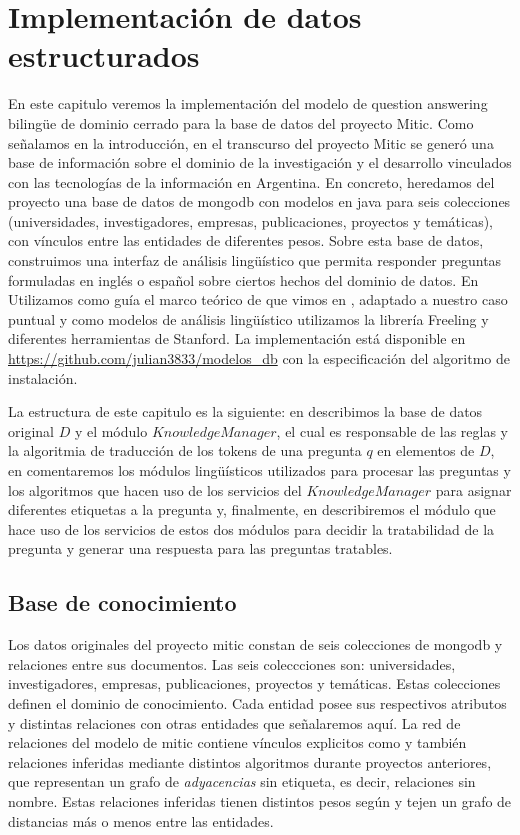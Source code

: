 \chapter{Implementación de datos estructurados}
\label{chap:4}
\horrible
En este capitulo veremos la implementación del modelo de question answering bilingüe de dominio cerrado para la base de datos del proyecto Mitic. Como señalamos en la introducción, en el transcurso del proyecto Mitic se generó una base de información sobre el dominio de la investigación y el desarrollo vinculados con las tecnologías de la información en Argentina. En concreto, heredamos del proyecto una base de datos de mongodb con modelos en java para seis colecciones (universidades, investigadores, empresas, publicaciones, proyectos y temáticas), con vínculos entre las entidades de diferentes pesos. Sobre esta base de datos, construimos una interfaz de análisis lingüístico que permita responder preguntas formuladas en inglés o español sobre ciertos hechos del dominio de datos. En Utilizamos como guía el marco teórico de \cite{QADB1} que vimos en , adaptado a nuestro caso puntual y como modelos de análisis lingüístico utilizamos la librería Freeling y diferentes herramientas de Stanford. La implementación está disponible en \url{https://github.com/julian3833/modelos_db} con la especificación del algoritmo de instalación. 

La estructura de este capitulo es la siguiente: en  describimos la base de datos original $D$ y el módulo $KnowledgeManager$, el cual es responsable de las reglas y la algoritmia de traducción de los tokens de una pregunta $q$ en elementos de $D$, en  comentaremos los módulos lingüísticos utilizados para procesar las preguntas y los algoritmos que hacen uso de los servicios del $KnowledgeManager$ para asignar diferentes etiquetas a la pregunta y, finalmente, en  describiremos el módulo que hace uso de los servicios de estos dos módulos para decidir la tratabilidad de la pregunta y generar una respuesta para las preguntas tratables.

\section{Base de conocimiento}
\label{sec:grafo-mitic}

Los datos originales del proyecto mitic constan de seis colecciones de mongodb y relaciones entre sus documentos. Las seis coleccciones son: universidades, investigadores, empresas, publicaciones, proyectos y temáticas. Estas colecciones definen el dominio de conocimiento. Cada entidad posee sus respectivos atributos y distintas relaciones con otras entidades que señalaremos aquí. La red de relaciones del modelo de mitic contiene vínculos explicitos como  y también relaciones inferidas mediante distintos algoritmos durante proyectos anteriores, que representan un grafo de \textit{adyacencias} sin etiqueta, es decir, relaciones sin nombre. Estas relaciones inferidas tienen distintos pesos según y tejen un grafo de distancias más o menos  entre las entidades. 

